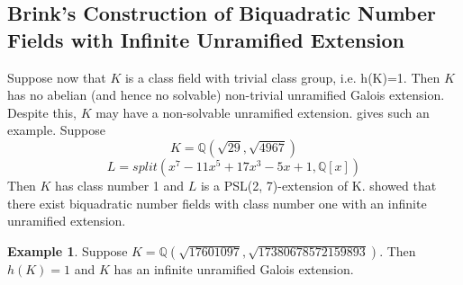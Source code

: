 \documentclass[12pt]{extarticle}
\newcommand{\Q}{\mathbb{Q}}
\newcommand{\<}{\langle}
\renewcommand{\>}{\rangle}
\theoremstyle{definition}
\newtheorem*{example}{Example}
\begin{document}
\subsection{Brink's Construction of Biquadratic Number Fields with Infinite Unramified Extension}

Suppose now that $K$ is a class field with trivial class group, i.e. h(K)=1. Then $K$ has no abelian (and hence no
solvable) non-trivial unramified Galois extension. Despite this, $K$ may have a non-solvable unramified extension. \cite{BRINK} gives such an example. Suppose
\begin{equation}
   K=\mathbb{Q}(\sqrt{29},\sqrt{4967}) 
\end{equation}
\begin{equation}
   L=split(x^7 - 11x^5 + 17x^3 - 5x + 1,\mathbb{Q}[x])
\end{equation}
Then $K$ has class number 1 and $L$ is a PSL(2, 7)-extension of K.
\cite{MAIR} showed that there exist biquadratic number fields with class number one with an infinite unramified extension. 
\begin{example}
Suppose $K= \Q( \sqrt{17601097}, \sqrt{17380678572159893})$. Then $h(K)=1$ and $K$ has an infinite unramified Galois extension. 
\end{example}
\end{document}
